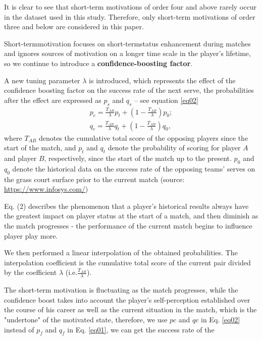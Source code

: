 \documentclass{mcmthesis}
\begin{document}
It is clear to see that short-term motivations of order four
and above rarely occur in the dataset used in this study. Therefore, only short-term motivations
of order three and below are considered in this paper.\par
Short-termmotivation focuses on short-termstatus enhancement during matches and ignores
sources of motivation on a longer time scale in the player’s lifetime, so we continue to introduce
a \textbf{confidence-boosting factor}.\par
A new tuning parameter $\lambda$ is introduced, which represents the effect of the confidence
boosting factor on the success rate of the next serve, the probabilities after the effect are
expressed as $p_s$ and $q_s$ – see equation \eqref{eq02}
\begin{equation}
  \begin{split}
    p_c = \frac{T_{AB}}{\lambda} p_t + \left(1 - \frac{T_{AB}}{\lambda}\right) p_0;\\
  q_c = \frac{T_{AB}}{\lambda} q_t + \left(1 - \frac{T_{AB}}{\lambda}\right) q_0,
  \end{split}
  \label{eq02}
\end{equation}
where $T_{AB}$ denotes the cumulative total score of the opposing players since the start of the
match, and $p_t$ and $q_t$ denote the probability of scoring for player $A$ and player $B$, respectively,
since the start of the match up to the present. $p_0$ and $q_0$ denote the historical data on the success
rate of the opposing teams’ serves on the grass court surface prior to the current match (source:
\url{https://www.infosys.com/})\par
Eq. (2) describes the phenomenon that a player’s historical results always have the greatest
impact on player status at the start of a match, and then diminish as the match progresses - the
performance of the current match begins to influence player play more.\par
We then performed a linear interpolation of the obtained probabilities. The interpolation
coefficient is the cumulative total score of the current pair divided by the coefficient $\lambda$ (i.e.$\frac{T_{AB}}{\lambda}$).\par
The short-term motivation is fluctuating as the match progresses, while the confidence boost
takes into account the player’s self-perception established over the course of his career as well
as the current situation in the match, which is the "undertone" of the motivated state, therefore,
we use $pc$ and $qc$ in Eq. \eqref{eq02} instead of $p_f$ and $q_f$ in Eq. \eqref{eq01}, we can get the success rate of the
\end{document}
